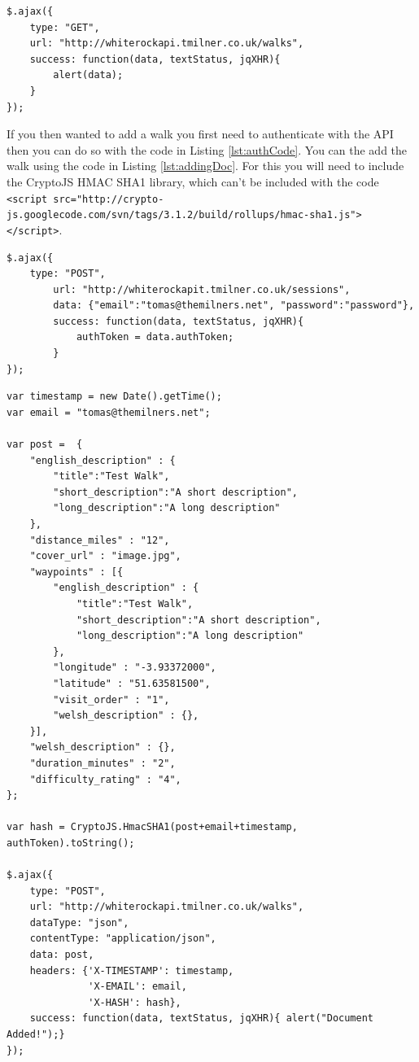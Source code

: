 \documentclass[11pt,a4paper]{report}
\begin{document}
\begin{lstlisting}[captionpos=b, caption=Basic request code., label=lst:req]
$.ajax({
    type: "GET",
    url: "http://whiterockapi.tmilner.co.uk/walks",
    success: function(data, textStatus, jqXHR){
    	alert(data);
    }
});
\end{lstlisting}

If you then wanted to add a walk you first need to authenticate with the API then you can do so with the code in Listing \ref{lst:authCode}. You can the add the walk using the code in Listing \ref{lst:addingDoc}. For this you will need to include the CryptoJS HMAC SHA1 library, which can't be included with the code \lstinline$<script src="http://crypto-js.googlecode.com/svn/tags/3.1.2/build/rollups/hmac-sha1.js"></script>$.

\begin{lstlisting}[captionpos=b, caption=Basic authorisation code., label=lst:authCode]
$.ajax({
	type: "POST",
    	url: "http://whiterockapit.tmilner.co.uk/sessions",
    	data: {"email":"tomas@themilners.net", "password":"password"}, 
    	success: function(data, textStatus, jqXHR){
    		authToken = data.authToken;
    	}
});
\end{lstlisting}

\begin{lstlisting}[captionpos=b, caption=Adding a walk., label=lst:addingDoc]
var timestamp = new Date().getTime();
var email = "tomas@themilners.net";

var post =  {
	"english_description" : {
	  	"title":"Test Walk",
		"short_description":"A short description",
		"long_description":"A long description"
	},
	"distance_miles" : "12",
	"cover_url" : "image.jpg",
	"waypoints" : [{
		"english_description" : {
			"title":"Test Walk",
			"short_description":"A short description",
			"long_description":"A long description"
		},
		"longitude" : "-3.93372000",
		"latitude" : "51.63581500",
		"visit_order" : "1",
		"welsh_description" : {},
	}],
	"welsh_description" : {},
	"duration_minutes" : "2",
	"difficulty_rating" : "4",
};

var hash = CryptoJS.HmacSHA1(post+email+timestamp, authToken).toString();

$.ajax({
    type: "POST",
    url: "http://whiterockapi.tmilner.co.uk/walks",
    dataType: "json",
    contentType: "application/json",
    data: post,
    headers: {'X-TIMESTAMP': timestamp,
        	  'X-EMAIL': email,
        	  'X-HASH': hash},
    success: function(data, textStatus, jqXHR){ alert("Document Added!");}
});
\end{lstlisting}
\end{document}
